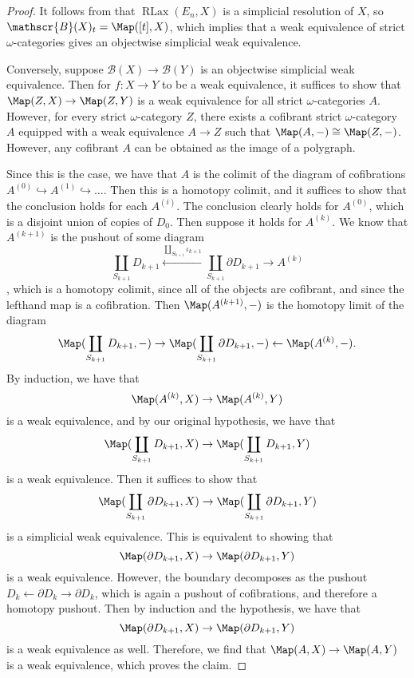 \begin{proof}  
It follows from \cite{lmw} that \(\operatorname{RLax}(E_n,X)\) is a simplicial resolution of \(X\), so \(\mathscr{B}(X)_t=\Map([t],X)\), which implies that a weak equivalence of strict \(\omega\)-categories gives an objectwise simplicial weak equivalence.  

Conversely, suppose \(\mathscr{B}(X)\to \mathscr{B}(Y)\) is an objectwise simplicial weak equivalence.  Then for \(f:X\to Y\) to be a weak equivalence, it suffices to show that \(\Map(Z,X)\to \Map(Z,Y)\) is a weak equivalence for all strict \(\omega\)-categories \(A\).  However, for every strict \(\omega\)-category \(Z\), there exists a cofibrant strict \(\omega\)-category \(A\) equipped with a weak equivalence \(A\to Z\) such that \(\Map(A,-) \cong \Map(Z,-)\).   However, any cofibrant \(A\) can be obtained as the image of a polygraph.  

Since this is the case, we have that \(A\) is the colimit of the diagram of cofibrations  \(A^{(0)} \hookrightarrow A^{(1)} \hookrightarrow \dots\).  Then this is a homotopy colimit, and it suffices to show that the conclusion holds for each \(A^{(i)}\). The conclusion clearly holds for \(A^{(0)}\), which is a disjoint union of copies of \(D_0\).  Then suppose it holds for \(A^{(k)}\).  We know that \(A^{(k+1)}\) is the pushout of some diagram \[\coprod_{S_{k+1}} D_{k+1} \xleftarrow{\coprod_{S_{k+1}} \iota_{k+1}} \coprod_{S_{k+1}} \partial D_{k+1} \to A^{(k)}\], which is a homotopy colimit, since all of the objects are cofibrant, and since the lefthand map is a cofibration.  Then \(\Map(A^{(k+1)}, -)\) is the homotopy limit of the diagram \[\Map(\coprod_{S_{k+1}} D_{k+1},-) \to \Map(\coprod_{S_{k+1}} \partial D_{k+1},-) \leftarrow \Map(A^{(k)},-).\]  By induction, we have that \[\Map(A^{(k)},X) \to \Map(A^{(k)},Y)\] is a weak equivalence, and by our original hypothesis, we have that \[\Map(\coprod_{S_{k+1}} D_{k+1},X)\to \Map(\coprod_{S_{k+1}} D_{k+1},Y)\]  is a weak equivalence.  Then it suffices to show that \[\Map(\coprod_{S_{k+1}} \partial D_{k+1},X)\to \Map(\coprod_{S_{k+1}} \partial D_{k+1},Y)\] is a simplicial weak equivalence.  This is equivalent to showing that \[\Map(\partial D_{k+1},X)\to \Map(\partial D_{k+1}, Y)\] is a weak equivalence.  However, the boundary decomposes as the pushout \(D_k \leftarrow \partial D_k \to \partial D_k\), which is again a pushout of cofibrations, and therefore a homotopy pushout.  Then by induction and the hypothesis, we have that \[\Map(\partial D_{k+1},X) \to \Map(\partial D_{k+1}, Y)\] is a weak equivalence as well. Therefore, we find that \(\Map(A,X)\to \Map(A,Y)\) is a weak equivalence, which proves the claim.  
\end{proof}


